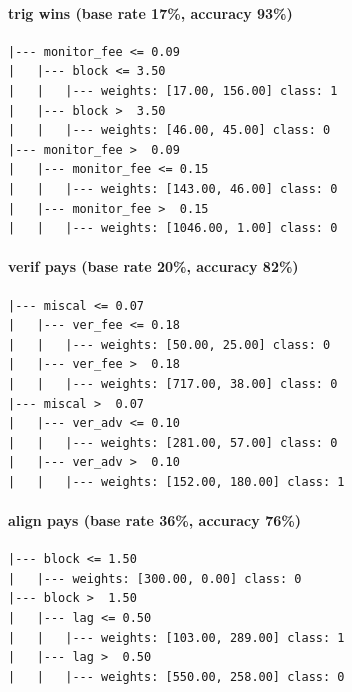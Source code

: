\paragraph{trig wins (base rate 17\%, accuracy 93\%)}
\begin{verbatim}
|--- monitor_fee <= 0.09
|   |--- block <= 3.50
|   |   |--- weights: [17.00, 156.00] class: 1
|   |--- block >  3.50
|   |   |--- weights: [46.00, 45.00] class: 0
|--- monitor_fee >  0.09
|   |--- monitor_fee <= 0.15
|   |   |--- weights: [143.00, 46.00] class: 0
|   |--- monitor_fee >  0.15
|   |   |--- weights: [1046.00, 1.00] class: 0
\end{verbatim}
\paragraph{verif pays (base rate 20\%, accuracy 82\%)}
\begin{verbatim}
|--- miscal <= 0.07
|   |--- ver_fee <= 0.18
|   |   |--- weights: [50.00, 25.00] class: 0
|   |--- ver_fee >  0.18
|   |   |--- weights: [717.00, 38.00] class: 0
|--- miscal >  0.07
|   |--- ver_adv <= 0.10
|   |   |--- weights: [281.00, 57.00] class: 0
|   |--- ver_adv >  0.10
|   |   |--- weights: [152.00, 180.00] class: 1
\end{verbatim}
\paragraph{align pays (base rate 36\%, accuracy 76\%)}
\begin{verbatim}
|--- block <= 1.50
|   |--- weights: [300.00, 0.00] class: 0
|--- block >  1.50
|   |--- lag <= 0.50
|   |   |--- weights: [103.00, 289.00] class: 1
|   |--- lag >  0.50
|   |   |--- weights: [550.00, 258.00] class: 0
\end{verbatim}